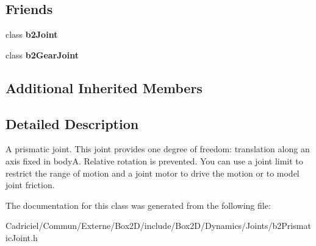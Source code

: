 \subsection*{Friends}
\begin{DoxyCompactItemize}
\item 
class {\bfseries b2\+Joint}\hypertarget{classb2_prismatic_joint_a54ade8ed3d794298108d7f4c4e4793fa}{}\label{classb2_prismatic_joint_a54ade8ed3d794298108d7f4c4e4793fa}

\item 
class {\bfseries b2\+Gear\+Joint}\hypertarget{classb2_prismatic_joint_a13c275221e30bb485e17e4e04553cb71}{}\label{classb2_prismatic_joint_a13c275221e30bb485e17e4e04553cb71}

\end{DoxyCompactItemize}
\subsection*{Additional Inherited Members}


\subsection{Detailed Description}
A prismatic joint. This joint provides one degree of freedom\+: translation along an axis fixed in bodyA. Relative rotation is prevented. You can use a joint limit to restrict the range of motion and a joint motor to drive the motion or to model joint friction. 

The documentation for this class was generated from the following file\+:\begin{DoxyCompactItemize}
\item 
Cadriciel/\+Commun/\+Externe/\+Box2\+D/include/\+Box2\+D/\+Dynamics/\+Joints/b2\+Prismatic\+Joint.\+h\end{DoxyCompactItemize}
